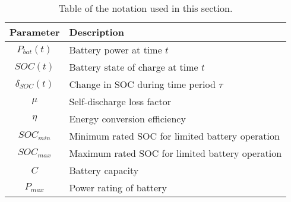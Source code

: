 \singlespacing
\begin{table}[htb]\centering
\small
\begin{tabular}{cl}
\hline
{\bf Parameter} & {\bf Description} \\
\hline
$P_{bat}(t)$ & Battery power at time $t$\\
$SOC(t)$ & Battery state of charge at time $t$\\
$\delta_{SOC}(t)$ & Change in SOC during time period $\tau$\\
$\mu$ & Self-discharge loss factor\\
$\eta$ & Energy conversion efficiency\\
$SOC_{min}$ & Minimum rated SOC for limited battery operation\\
$SOC_{max}$ & Maximum rated SOC for limited battery operation\\
$C$ & Battery capacity\\
$P_{max}$ & Power rating of battery\\
\hline
\end{tabular}
\caption{Table of the notation used in this section.}
\label{ch1:tab:notation-ev-model}
\end{table}
\doublespacing
